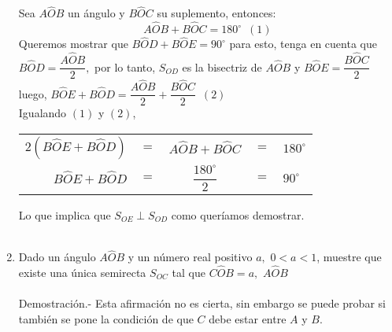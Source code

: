 \documentclass[10pt]{article}
\begin{document}
\begin{enumerate}
\begin{center}
\begin{tikzpicture}
	    \end{tikzpicture}
	\end{center}
	Sea $A\widehat{O}B$ un ángulo y $B\widehat{O}C$ su suplemento, entonces: $$A\widehat{O}B + B\widehat{O}C = 180^{\circ}\,\,\, (1)$$ Queremos mostrar que $B\widehat{O}D + B\widehat{O}E = 90^{\circ}$ para esto, tenga en cuenta que $B\widehat{O}D = \dfrac{A\widehat{O}B}{2},$ por lo tanto, $S_{OD}$ es la bisectriz de $A\widehat{O}B$ y $B\widehat{O}E = \dfrac{B\widehat{O}C}{2}$ luego, $B\widehat{O}E + B\widehat{O}D = \dfrac{A\widehat{O}B}{2} + \dfrac{B\widehat{O}C}{2}\,\,\, (2)$\\ 
	Igualando $(1)$ y $(2)$, 
	\begin{center}
	    \begin{tabular}{rcccl}
		$2(B\widehat{O}E + B\widehat{O}D)$ & $=$ & $A\widehat{O}B + B\widehat{O}C$ & $=$ & $180^{\circ}$\\
		$B\widehat{O}E + B\widehat{O}D$ & $=$ & $\dfrac{180^{\circ}}{2}$ & $=$ & $90^{\circ}$\\ 
	    \end{tabular}
	\end{center}

	Lo que implica que $S_{OE} \perp S_{OD}$ como queríamos demostrar.\\\\

	\item Dado un ángulo $A\widehat{O}B$ y un número real positivo $a,$ $0<a<1$, muestre que existe una única semirecta $S_{OC}$ tal que $C \widehat{O}B=a,$ $A \widehat{O} B$\\\\
	Demostración.-\; Esta afirmación no es cierta, sin embargo se puede probar si también se pone la condición de que $C$ debe estar entre $A$ y $B$.\\\\


    \end{enumerate}
\end{document}
